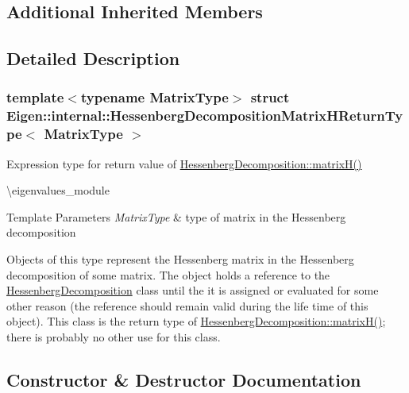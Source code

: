 \subsection*{Additional Inherited Members}


\subsection{Detailed Description}
\subsubsection*{template$<$typename Matrix\+Type$>$\newline
struct Eigen\+::internal\+::\+Hessenberg\+Decomposition\+Matrix\+H\+Return\+Type$<$ Matrix\+Type $>$}

Expression type for return value of \mbox{\hyperlink{class_eigen_1_1_hessenberg_decomposition_a8e781d2e22a2304647bcf0ae913cc8ea}{Hessenberg\+Decomposition\+::matrix\+H()}} 

\textbackslash{}eigenvalues\+\_\+module


\begin{DoxyTemplParams}{Template Parameters}
{\em Matrix\+Type} & type of matrix in the Hessenberg decomposition\\
\hline
\end{DoxyTemplParams}
Objects of this type represent the Hessenberg matrix in the Hessenberg decomposition of some matrix. The object holds a reference to the \mbox{\hyperlink{class_eigen_1_1_hessenberg_decomposition}{Hessenberg\+Decomposition}} class until the it is assigned or evaluated for some other reason (the reference should remain valid during the life time of this object). This class is the return type of \mbox{\hyperlink{class_eigen_1_1_hessenberg_decomposition_a8e781d2e22a2304647bcf0ae913cc8ea}{Hessenberg\+Decomposition\+::matrix\+H()}}; there is probably no other use for this class. 

\subsection{Constructor \& Destructor Documentation}
\mbox{\label{struct_eigen_1_1internal_1_1_hessenberg_decomposition_matrix_h_return_type_aa6d46d84c1343c964c50457ca4ddf9fa}} 

